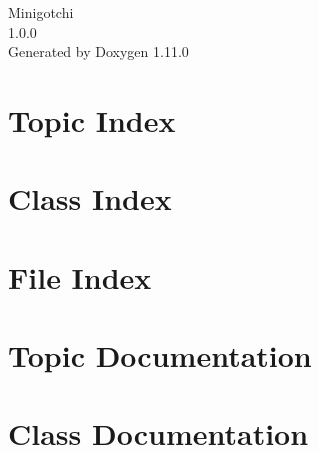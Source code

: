 \documentclass[twoside]{book}
\newcommand{\+}{\discretionary{\mbox{\scriptsize$\hookleftarrow$}}{}{}}
\newcommand{\clearemptydoublepage}{%
    \newpage{\pagestyle{empty}\cleardoublepage}%
  }
\begin{document}
  \raggedbottom
    \hypersetup{pageanchor=false,
                bookmarksnumbered=true,
                pdfencoding=unicode
               }
  \begin{titlepage}
  \vspace*{7cm}
  \begin{center}%
  {\Large Minigotchi}\\
  [1ex]\large 1.\+0.\+0 \\
  \vspace*{1cm}
  {\large Generated by Doxygen 1.11.0}\\
  \end{center}
  \end{titlepage}
  \clearemptydoublepage
  \tableofcontents
  \clearemptydoublepage
  \hypersetup{pageanchor=true}
\chapter{Topic Index}

\chapter{Class Index}

\chapter{File Index}

\chapter{Topic Documentation}

\chapter{Class Documentation}


















\end{document}
